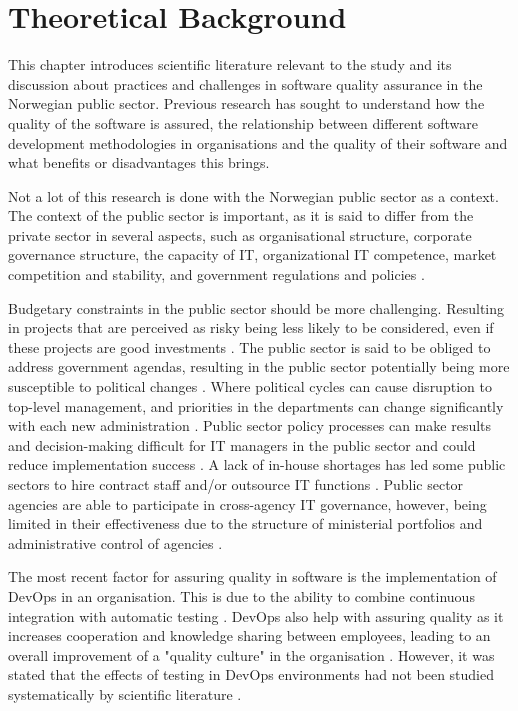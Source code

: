 \chapter{Theoretical Background} \label{sec:theoretical_background}
This chapter introduces scientific literature relevant to the study and its discussion about practices and challenges in software quality assurance in the Norwegian public sector. Previous research has sought to understand how the quality of the software is assured, the relationship between different software development methodologies in organisations and the quality of their software and what benefits or disadvantages this brings. 

Not a lot of this research is done with the Norwegian public sector as a context. The context of the public sector is important, as it is said to differ from the private sector in several aspects, such as organisational structure, corporate governance structure, the capacity of IT, organizational IT competence, market competition and stability, and government regulations and policies \cite{jc_2010}.

Budgetary constraints in the public sector should be more challenging. Resulting in projects that are perceived as risky being less likely to be considered, even if these projects are good investments \cite{jc_2010}. The public sector is said to be obliged to address government agendas, resulting in the public sector potentially being more susceptible to political changes \cite{jc_2010}. Where political cycles can cause disruption to top-level management, and priorities in the departments can change significantly with each new administration \cite{jc_2010}. Public sector policy processes can make results and decision-making difficult for IT managers in the public sector and could reduce implementation success \cite{jc_2010}. A lack of in-house shortages has led some public sectors to hire contract staff and/or outsource IT functions \cite{jc_2010}. Public sector agencies are able to participate in cross-agency IT governance, however, being limited in their effectiveness due to the structure of ministerial portfolios and administrative control of agencies \cite{jc_2010}.

The most recent factor for assuring quality in software is the implementation of DevOps in an organisation. This is due to the ability to combine continuous integration with automatic testing \cite{am_2020}\cite{smm_2018}\cite{ml_2022}. DevOps also help with assuring quality as it increases cooperation and knowledge sharing between employees, leading to an overall improvement of a "quality culture" in the organisation \cite{smm_2018}\cite{mm_2021}. However, it was stated that the effects of testing in DevOps environments had not been studied systematically by scientific literature \cite{dsc_2019}\cite{ja_2016}.

